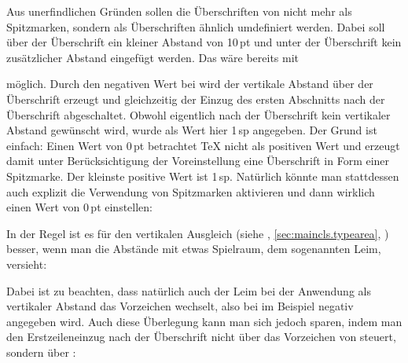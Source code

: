 \begin{Example}
  Aus unerfindlichen Gründen sollen die Überschriften von
   nicht mehr als Spitzmarken, sondern als
  Überschriften ähnlich  umdefiniert
  werden. Dabei soll über der Überschrift ein kleiner Abstand von 10\,pt und
  unter der Überschrift kein zusätzlicher Abstand eingefügt werden. Das wäre
  bereits mit
\begin{lstcode}
\end{lstcode}
  möglich. Durch den negativen Wert bei  wird der vertikale
  Abstand über der Überschrift erzeugt und gleichzeitig der Einzug des ersten
  Abschnitts nach der Überschrift abgeschaltet. Obwohl eigentlich nach der
  Überschrift kein vertikaler Abstand gewünscht wird, wurde als Wert hier
  1\,sp angegeben. Der Grund ist einfach: Einen Wert von 0\,pt betrachtet
  \TeX{} nicht als positiven Wert und  erzeugt
  damit unter Berücksichtigung der Voreinstellung 
  eine Überschrift in Form einer Spitzmarke. Der kleinste positive Wert
  ist 1\,sp. Natürlich könnte man stattdessen auch explizit die Verwendung von
  Spitzmarken aktivieren und dann wirklich einen Wert von 0\,pt einstellen:
\begin{lstcode}
\end{lstcode}

  In der Regel ist es für den vertikalen Ausgleich (siehe
  , \autoref{sec:maincls.typearea},
  ) besser, wenn man die Abstände
  mit etwas Spielraum, dem sogenannten Leim, versieht:
\begin{lstcode}
\end{lstcode}
  Dabei ist zu beachten, dass natürlich auch der Leim bei der Anwendung als
  vertikaler Abstand das Vorzeichen wechselt, also bei  im
  Beispiel negativ angegeben wird. Auch diese Überlegung kann man sich jedoch
  sparen, indem man den Erstzeileneinzug nach der Überschrift nicht über das
  Vorzeichen von  steuert, sondern über
  :
\begin{lstcode}
\end{lstcode}
\end{Example}


